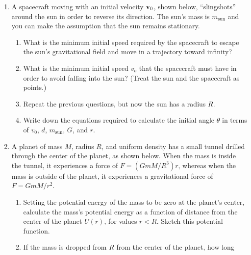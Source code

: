 \documentclass{../../oss-apphys}
\begin{document}
\begin{enumerate}[leftmargin=15pt]
\item A spacecraft moving with an initial velocity $\mathbf{v}_0$, shown below,
  ``slingshots'' around the sun in order to reverse its direction. The sun's
  mass is $m_\mathrm{sun}$ and you can make the assumption that the sun remains
  stationary.\\
  \begin{minipage}{0.28\textwidth}
  \end{minipage}
  \begin{minipage}{0.7\textwidth}
    \begin{enumerate}[noitemsep]
    \item What is the minimum initial speed required by the spacecraft to escape
      the sun's gravitational field and move in a trajectory toward infinity?
    \item What is the minimum initial speed $v_o$ that the spacecraft must have
      in order to avoid falling into the sun? (Treat the sun and the spacecraft
      as points.)
    \item Repeat the previous questions, but now the sun has a radius $R$.
    \item Write down the equations required to calculate the initial angle
      $\theta$ in terms of $v_0$, $d$, $m_\mathrm{sun}$, $G$, and $r$.
    \end{enumerate}
  \end{minipage}
  \newpage
\item A planet of mass $M$, radius $R$, and uniform density has a small tunnel
  drilled through the center of the planet, as shown below. When the mass is
  inside the tunnel, it experiences a force of $F=(GmM/R^3)r$, whereas when the
  mass is outside of the planet, it experiences a gravitational force of
  $F=GmM/r^2$.
  \begin{center}
  \end{center}
  \begin{enumerate}[noitemsep,leftmargin=20pt]
  \item Setting the potential energy of the mass to be zero at the planet's
    center, calculate the mass's potential energy as a function of distance from
    the center of the planet $U(r)$, for values $r<R$. Sketch this potential
    function.
  \item If the mass is dropped from $R$ from the center of the planet, how long

\end{enumerate}
\end{enumerate}
\end{document}
